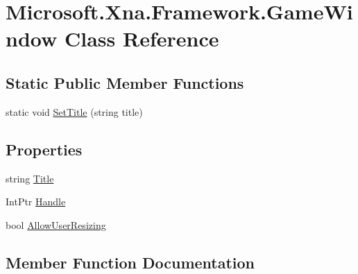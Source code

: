 \hypertarget{class_microsoft_1_1_xna_1_1_framework_1_1_game_window}{}\section{Microsoft.\+Xna.\+Framework.\+Game\+Window Class Reference}
\label{class_microsoft_1_1_xna_1_1_framework_1_1_game_window}
\subsection*{Static Public Member Functions}
\begin{DoxyCompactItemize}
\item 
static void \hyperlink{class_microsoft_1_1_xna_1_1_framework_1_1_game_window_af668f08bd57e3e07a59a9efa39a10d8c}{Set\+Title} (string title)
\end{DoxyCompactItemize}
\subsection*{Properties}
\begin{DoxyCompactItemize}
\item 
string \hyperlink{class_microsoft_1_1_xna_1_1_framework_1_1_game_window_a6bc8d6487c96d42c75846b315ed82a70}{Title}
\item 
Int\+Ptr \hyperlink{class_microsoft_1_1_xna_1_1_framework_1_1_game_window_acdcd2ae98b037d76c3cd1c4dab770ca5}{Handle}
\item 
bool \hyperlink{class_microsoft_1_1_xna_1_1_framework_1_1_game_window_a3a52c18b42184ddf573ca584be0f6045}{Allow\+User\+Resizing}
\end{DoxyCompactItemize}


\subsection{Member Function Documentation}
\hypertarget{class_microsoft_1_1_xna_1_1_framework_1_1_game_window_af668f08bd57e3e07a59a9efa39a10d8c}{}
